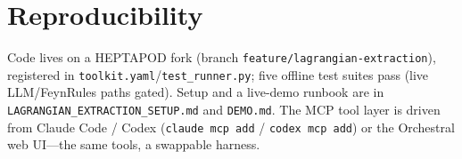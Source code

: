 \documentclass[11pt]{article}
\newcommand{\code}[1]{\texttt{#1}}
\begin{document}
\section{Reproducibility}

Code lives on a HEPTAPOD fork (branch \code{feature/lagrangian-extraction}),
registered in \code{toolkit.yaml}/\code{test\_runner.py}; five offline test
suites pass (live LLM/FeynRules paths gated). Setup and a live-demo runbook are
in \code{LAGRANGIAN\_EXTRACTION\_SETUP.md} and \code{DEMO.md}. The MCP tool layer
is driven from Claude Code / Codex (\code{claude mcp add} / \code{codex mcp add})
or the Orchestral web UI---the same tools, a swappable harness.
\end{document}
